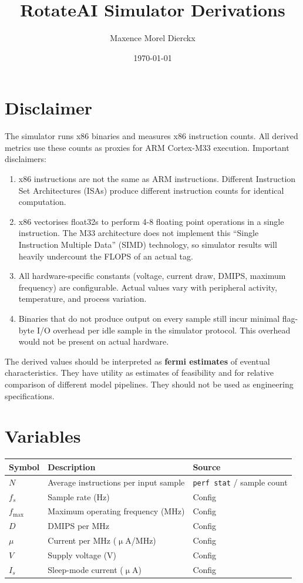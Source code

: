 \documentclass[12pt]{article}
\title{RotateAI Simulator Derivations}
\author{Maxence Morel Dierckx}
\date{\today}
\begin{document}
\maketitle

\section{Disclaimer}

The simulator runs x86 binaries and measures x86 instruction counts. All derived metrics use these counts as proxies for ARM Cortex-M33 execution. Important disclaimers:

\begin{enumerate}
	\item x86 instructions are not the same as ARM instructions. Different Instruction Set Architectures (ISAs) produce different instruction counts for identical computation.
	\item x86 vectorises float32s to perform 4-8 floating point operations in a single instruction. The M33 architecture does not implement this ``Single Instruction Multiple Data'' (SIMD) technology, so simulator results will heavily undercount the FLOPS of an actual tag.
	\item All hardware-specific constants (voltage, current draw, DMIPS, maximum frequency) are configurable. Actual values vary with peripheral activity, temperature, and process variation.
	\item Binaries that do not produce output on every sample still incur minimal flag-byte I/O overhead per idle sample in the simulator protocol. This overhead would not be present on actual hardware.
\end{enumerate}

The derived values should be interpreted as \textbf{fermi estimates} of eventual characteristics. They have utility as estimates of feasibility and for relative comparison of different model pipelines. They should not be used as engineering specifications.

\section{Variables}

\begin{tabular}{l l l}
	\textbf{Symbol} & \textbf{Description} & \textbf{Source} \\
	\hline
	$N$ & Average instructions per input sample & \verb|perf stat| / sample count \\
	$f_s$ & Sample rate (Hz) & Config \\
	$f_{\max}$ & Maximum operating frequency (MHz) & Config \\
	$D$ & DMIPS per MHz & Config \\
	$\mu$ & Current per MHz ($\upmu$A/MHz) & Config \\
	$V$ & Supply voltage (V) & Config \\
	$I_s$ & Sleep-mode current ($\upmu$A) & Config \\
\end{tabular}
\end{document}
